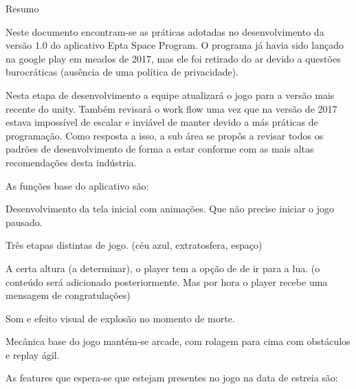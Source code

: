 {
	\thispagestyle{empty}     %
	
	{\LARGE Resumo} %
    \vspace{1cm}
	
    Neste documento encontram-se as práticas adotadas no desenvolvimento da versão $1.0$ do aplicativo Epta Space Program. O programa já havia sido lançado na google play em meados de 2017, mas ele foi retirado do ar devido a questões burocráticas (ausência de uma política de privacidade). 

    Nesta etapa de desenvolvimento a equipe atualizará o jogo para a versão mais recente do unity.
    Também revisará o work flow uma vez que na versão de 2017 estava impossível de escalar e inviável de manter devido a más práticas de programação.
    Como resposta a isso, a sub área se propôs a revisar todos os padrões de desenvolvimento de forma a estar conforme com as mais altas recomendações desta indústria.


    As funções base do aplicativo são:

    \begin{description}[font=$\bullet$~\normalfont\scshape]
        \item [Tela inicial] Desenvolvimento da tela inicial com animações. Que não precise iniciar o jogo pausado.
        \item [3 fases] Três etapas distintas de jogo. (céu azul, extratosfera, espaço)
        \item [Fase final] A certa altura (a determinar), o player tem a opção de de ir para a lua. (o conteúdo será adicionado posteriormente. Mas por hora o player recebe uma mensagem de congratulações)
        \item [Morte] Som e efeito visual de explosão no momento de morte.
        \item [Arcade] Mecânica base do jogo mantém-se arcade, com rolagem para cima com obstáculos e replay ágil.
    \end{description}

    As features que espera-se que estejam presentes no jogo na data de estreia são:

}
